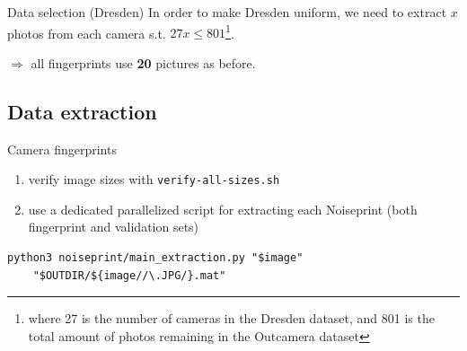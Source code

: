 \begin{frame}[fragile]{Data selection (Dresden)}
    In order to make Dresden uniform, we need to extract $x$ photos from each camera s.t. $27 x \le 801$\footnote{where 27 is the number of cameras in the Dresden dataset, and 801 is the total amount of photos remaining in the Outcamera dataset}.
    
    \medskip    
    
    $\Rightarrow$ all fingerprints use \textbf{20} pictures as before. 
    
    \medskip
    

\end{frame}

\subsection{Data extraction}

\begin{frame}[fragile]{Camera fingerprints}

    \begin{enumerate}
        \item verify image sizes with \texttt{verify-all-sizes.sh}
        \item use a dedicated parallelized script for extracting each Noiseprint (both fingerprint and validation sets)
    \end{enumerate}
    
    \medskip
    
    \begin{lstlisting}
python3 noiseprint/main_extraction.py "$image"
    "$OUTDIR/${image//\.JPG/}.mat"
    \end{lstlisting}
    
    \medskip
    
    
\end{frame}

